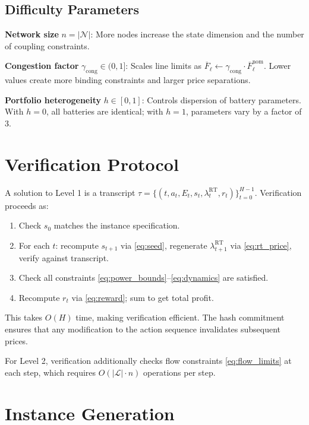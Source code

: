 \documentclass[11pt]{article}
\begin{document}
\subsection{Difficulty Parameters}

\textbf{Network size} $n = |\mathcal{N}|$: More nodes increase the state dimension and the number of coupling constraints.

\textbf{Congestion factor} $\gamma_{\text{cong}} \in (0,1]$: Scales line limits as $\overline{F}_\ell \gets \gamma_{\text{cong}} \cdot \overline{F}^{\text{nom}}_\ell$. Lower values create more binding constraints and larger price separations.

\textbf{Portfolio heterogeneity} $h \in [0,1]$: Controls dispersion of battery parameters. With $h = 0$, all batteries are identical; with $h = 1$, parameters vary by a factor of 3.


\section{Verification Protocol}

A solution to Level 1 is a transcript $\tau = \{(t, a_t, E_t, s_t, \lambda^{\text{RT}}_t, r_t)\}_{t=0}^{H-1}$. Verification proceeds as:

\begin{enumerate}
    \item Check $s_0$ matches the instance specification.
    \item For each $t$: recompute $s_{t+1}$ via \eqref{eq:seed}, regenerate $\lambda^{\text{RT}}_{t+1}$ via \eqref{eq:rt_price}, verify against transcript.
    \item Check all constraints \eqref{eq:power_bounds}--\eqref{eq:dynamics} are satisfied.
    \item Recompute $r_t$ via \eqref{eq:reward}; sum to get total profit.
\end{enumerate}

This takes $O(H)$ time, making verification efficient. The hash commitment ensures that any modification to the action sequence invalidates subsequent prices.

For Level 2, verification additionally checks flow constraints \eqref{eq:flow_limits} at each step, which requires $O(|\mathcal{L}| \cdot n)$ operations per step.


\section{Instance Generation}
\end{document}
